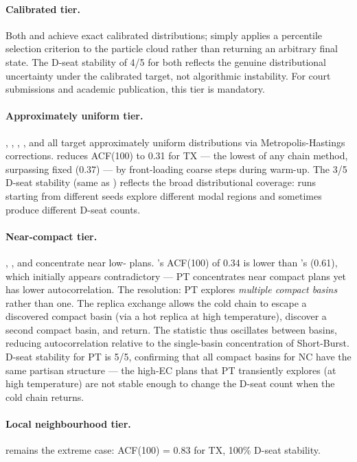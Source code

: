 \paragraph{Calibrated tier.}
Both \smc{} and \smcp{} achieve exact calibrated distributions; \smcp{}
simply applies a percentile selection criterion to the particle cloud rather
than returning an arbitrary final state.
The D-seat stability of 4/5 for both reflects the genuine distributional
uncertainty under the calibrated target, not algorithmic instability.
For court submissions and academic publication, this tier is mandatory.

\paragraph{Approximately uniform tier.}
\fr{}, \msp{}, \vra{}, \ms{}, and \ams{} all target approximately uniform
distributions via Metropolis-Hastings corrections.
\ams{} reduces ACF(100) to 0.31 for TX --- the lowest of any chain method,
surpassing fixed \ms{} (0.37) --- by front-loading coarse steps during
warm-up.
The 3/5 D-seat stability (same as \ms{}) reflects the broad distributional
coverage: runs starting from different seeds explore different modal regions
and sometimes produce different D-seat counts.

\paragraph{Near-compact tier.}
\sburst{}, \sburstf{}, and \pt{} concentrate near low-\ec{} plans.
\pt{}'s ACF(100) of 0.34 is lower than \sburst{}'s (0.61), which initially
appears contradictory --- PT concentrates near compact plans yet has lower
autocorrelation.
The resolution: PT explores \emph{multiple compact basins} rather than one.
The replica exchange allows the cold chain to escape a discovered compact
basin (via a hot replica at high temperature), discover a second compact
basin, and return.
The \ec{} statistic thus oscillates between basins, reducing autocorrelation
relative to the single-basin concentration of Short-Burst.
D-seat stability for PT is 5/5, confirming that all compact basins for NC
have the same partisan structure --- the high-EC plans that PT transiently
explores (at high temperature) are not stable enough to change the D-seat
count when the cold chain returns.

\paragraph{Local neighbourhood tier.}
\flip{} remains the extreme case: ACF(100) = 0.83 for TX, 100\% D-seat
stability.

